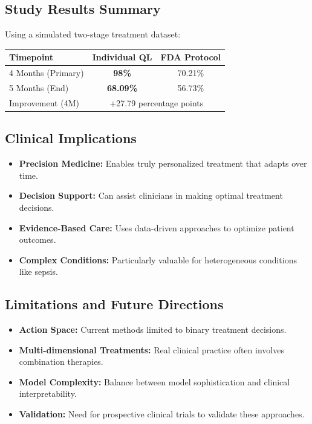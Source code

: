 \subsection*{Study Results Summary}
Using a simulated two-stage treatment dataset:

\begin{tabular}{lcc}
\hline
Timepoint & Individual QL & FDA Protocol \\
\hline
4 Months (Primary) & \textbf{98\%} & 70.21\% \\
5 Months (End) & \textbf{68.09\%} & 56.73\% \\
Improvement (4M) & \multicolumn{2}{c}{+27.79 percentage points} \\
\hline
\end{tabular}

\subsection*{Clinical Implications}
\begin{itemize}
    \item \textbf{Precision Medicine:} Enables truly personalized treatment that adapts over time.
    \item \textbf{Decision Support:} Can assist clinicians in making optimal treatment decisions.
    \item \textbf{Evidence-Based Care:} Uses data-driven approaches to optimize patient outcomes.
    \item \textbf{Complex Conditions:} Particularly valuable for heterogeneous conditions like sepsis.
\end{itemize}

\subsection*{Limitations and Future Directions}
\begin{itemize}
    \item \textbf{Action Space:} Current methods limited to binary treatment decisions.
    \item \textbf{Multi-dimensional Treatments:} Real clinical practice often involves combination therapies.
    \item \textbf{Model Complexity:} Balance between model sophistication and clinical interpretability.
    \item \textbf{Validation:} Need for prospective clinical trials to validate these approaches.
\end{itemize}


